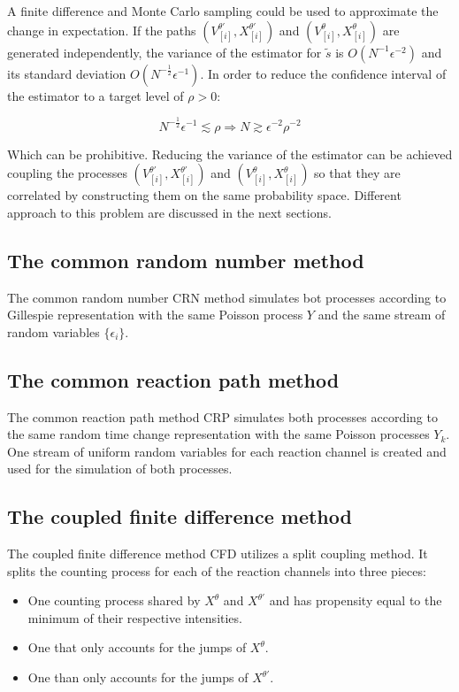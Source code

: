 A finite difference and Monte Carlo sampling could be used to approximate the change in expectation.
If the paths $(V_{[i]}^{\theta'}, X_{[i]}^{\theta'})$ and $(V_{[i]}^\theta, X_{[i]}^{\theta})$ are generated independently, the variance of the estimator for $\tilde{s}$ is $O(N^{-1}\epsilon^{-2})$ and its standard deviation $O(N^{-\frac{1}{2}}\epsilon^{-1})$.
In order to reduce the confidence interval of the estimator to a target level of $\rho >0$:

$$N^{-\frac{1}{2}}\epsilon^{-1}\lesssim\rho\Rightarrow N \gtrsim\epsilon^{-2}\rho^{-2}$$

Which can be prohibitive.
Reducing the variance of the estimator can be achieved coupling the processes $(V_{[i]}^{\theta'}, X_{[i]}^{\theta'})$ and $(V_{[i]}^\theta, X_{[i]}^{\theta})$ so that they are correlated by constructing them on the same probability space.
Different approach to this problem are discussed in the next sections.

	\subsection{The common random number method}
	The common random number CRN method simulates bot processes according to Gillespie representation with the same Poisson process $Y$ and the same stream of random variables $\{\epsilon_i\}$.

	\subsection{The common reaction path method}
	The common reaction path method CRP simulates both processes according to the same random time change representation with the same Poisson processes $Y_k$.
	One stream of uniform random variables for each reaction channel is created and used for the simulation of both processes.

	\subsection{The coupled finite difference method}
	The coupled finite difference method CFD utilizes a split coupling method.
	It splits the counting process for each of the reaction channels into three pieces:

	\begin{itemize}
		\item One counting process shared by $X^\theta$ and $X^{\theta'}$ and has propensity equal to the minimum of their respective intensities.
		\item One that only accounts for the jumps of $X^\theta$.
		\item One than only accounts for the jumps of $X^{\theta'}$.
	\end{itemize}

